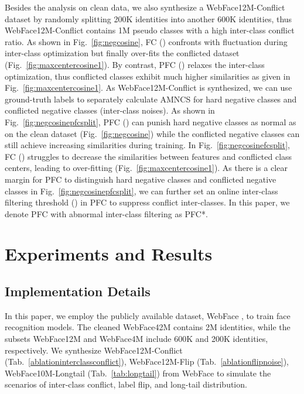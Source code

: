 \documentclass[10pt,twocolumn,letterpaper]{article}
\begin{document}
Besides the analysis on clean data, we also synthesize a WebFace12M-Conflict dataset by randomly splitting 200K identities into another 600K identities, thus WebFace12M-Conflict contains 1M pseudo classes with a high inter-class conflict ratio. As shown in Fig.~\ref{fig:negcosine}, FC () confronts with fluctuation during inter-class optimization but finally over-fits the conflicted dataset (Fig.~\ref{fig:maxcentercosine1}). By contrast, PFC () relaxes the inter-class optimization, thus conflicted classes exhibit much higher similarities as given in Fig.~\ref{fig:maxcentercosine1}. As WebFace12M-Conflict is synthesized, we can use ground-truth labels to separately calculate AMNCS for hard negative classes and conflicted negative classes (\ie inter-class noises). As shown in Fig.~\ref{fig:negcosinepfcsplit}, PFC () can punish hard negative classes as normal as on the clean dataset (Fig.~\ref{fig:negcosine}) while the conflicted negative classes can still achieve increasing similarities during training. In Fig.~\ref{fig:negcosinefcsplit}, FC () struggles to decrease the similarities between features and 
conflicted class centers, leading to over-fitting (Fig.~\ref{fig:maxcentercosine1}).
As there is a clear margin for PFC to distinguish hard negative classes and conflicted negative classes in Fig.~\ref{fig:negcosinepfcsplit}, we can further set an online inter-class filtering threshold () in PFC to suppress conflict inter-classes. In this paper, we denote PFC with abnormal inter-class filtering as PFC*.

\section{Experiments and Results}

\subsection{Implementation Details}

In this paper, we employ the publicly available dataset, WebFace \cite{zhu2021webface260m}, to train face recognition models. The cleaned WebFace42M contains 2M identities, while the subsets WebFace12M and WebFace4M include 600K and 200K identities, respectively. We synthesize WebFace12M-Conflict (Tab.~\ref{ablationinterclassconflict}), WebFace12M-Flip (Tab.~\ref{ablationflipnoise}), WebFace10M-Longtail (Tab.~\ref{tab:longtail}) from WebFace to simulate the scenarios of inter-class conflict, label flip, and long-tail distribution. 
\end{document}
